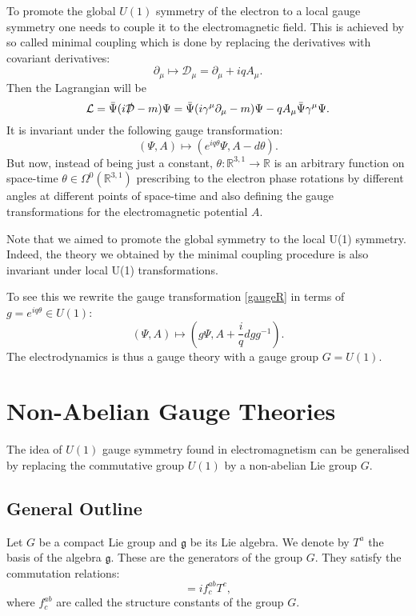 \documentclass[11pt]{report}
\theoremstyle{plain}
\theoremstyle{definition}
\theoremstyle{remark}
\theoremstyle{remark}
\numberwithin{equation}{section}
\begin{document}
To promote the global $U(1)$ symmetry of the electron to a local gauge symmetry one needs to couple it to the electromagnetic field. This is achieved by so called minimal coupling which is done by replacing the derivatives with covariant derivatives:
%
\begin{equation}
\partial_{\mu} \longmapsto \mathcal{D}_{\mu} = \partial_{\mu} + iqA_{\mu}.
\end{equation}
%
Then the Lagrangian will be
%
\begin{equation}
\mathcal{L} = \bar{\Psi}(i \slashed{\mathcal{D}} - m)\Psi = \bar{\Psi}(i \gamma^{\mu}\partial_{\mu} - m)\Psi - qA_{\mu}\bar{\Psi} \gamma^{\mu} \Psi.
\end{equation}
%
It is invariant under the following gauge transformation:
%
\begin{equation}\label{gaugeR}
(\Psi, A) \longmapsto (e^{iq\theta}\Psi, A - d\theta).
\end{equation}
%
But now, instead of being just a constant, $\theta :  \mathbb{R}^{3,1} \to \mathbb{R}$ is an arbitrary function on space-time $\theta \in \Omega^0(\mathbb{R}^{3,1})$ prescribing to the electron phase rotations by different angles at different points of space-time and also defining the gauge transformations for the electromagnetic potential $A$. 

Note that we aimed to promote the global symmetry to the local U(1) symmetry. 
Indeed, the theory we obtained by the minimal coupling procedure is also invariant under local U(1) transformations. 

To see this we rewrite the gauge transformation \eqref{gaugeR} in terms of $g = e^{iq\theta}\in U(1)$:
\begin{equation}
(\Psi, A) \longmapsto (g\Psi, A + \frac{i}{q}dg g^{-1}).
\end{equation}
%
The electrodynamics is thus a gauge theory with a gauge group $G=U(1)$.

\section{Non-Abelian Gauge Theories}

The idea of $U(1)$ gauge symmetry found in electromagnetism can be generalised by replacing the commutative group $U(1)$ by a non-abelian Lie group $G$.

 \subsection{General Outline}
 Let $G$ be a compact Lie group and $\mathfrak{g}$ be its Lie algebra. 
 We denote by $T^a$ the basis of the algebra $\mathfrak{g}$. These are the generators of the group $G$. They satisfy the commutation relations:
 \begin{equation}
 [T^a,T^b] = if^{ab}_cT^c,
 \end{equation}
 where $f^{ab}_c$ are called the structure constants of the group $G$. 
 
\end{document}
